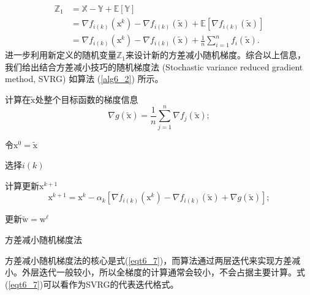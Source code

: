 \begin{equation}
    \begin{aligned}
    \mathbb{Z}_{1} &=\mathbb{X}-\mathbb{Y}+\mathbb{E}[\mathbb{Y}] \\
    &=\nabla f_{i(k)}\left(\mathrm{x}^{k}\right)-\nabla f_{i(k)}(\tilde{\mathrm{x}})+\mathbb{E}\left[\nabla f_{i(k)}(\tilde{\mathrm{x}})\right] \\
    &=\nabla f_{i(k)}\left(\mathrm{x}^{k}\right)-\nabla f_{i(k)}(\tilde{\mathrm{x}})+\frac{1}{n} \sum_{i=1}^{n} f_{i}(\tilde{\mathrm{x}}).
    \end{aligned}
    \nonumber
\end{equation}
进一步利用新定义的随机变量$\mathbb{Z}_{1}$来设计新的方差减小随机梯度。综合以上信息，我们给出结合方差减小技巧的随机梯度法 (Stochastic variance reduced gradient method, SVRG) \cite{SVRG}如算法 (\ref{alg6_2}) 所示。

\begin{algorithm}
    \SetAlgoLined

     {
        计算在$\tilde{\mathrm{x}}$处整个目标函数的梯度信息
            \begin{equation}
                \nabla g(\tilde{\mathrm{x}})=\frac{1}{n} \sum_{j=1}^{n} \nabla f_{j}(\tilde{\mathrm{x}});
                \nonumber
            \end{equation}
            
        令$\mathrm{x}^{0}=\tilde{\mathrm{x}}$
        
         {
            选择$i(k)$
            
            计算更新$\mathrm{x}^{k+1}$ 
                \begin{equation}
                    \mathrm{x}^{k+1}=\mathrm{x}^{k}-\alpha_{k}\left[\nabla f_{i(k)}\left(\mathrm{x}^{k}\right)-\nabla f_{i(k)}(\tilde{\mathrm{x}})+\nabla g(\tilde{\mathrm{x}})\right];
                    \label{eqt6_7}
                \end{equation}
        }
        
        更新$\tilde{\mathrm{w}}=\mathrm{w}^{\ell}$
    }
    \caption{方差减小随机梯度法}
    \label{alg6_2}
\end{algorithm}

\par 方差减小随机梯度法的核心是式(\ref{eqt6_7})，而算法通过两层迭代来实现方差减小。外层迭代一般较小，所以全梯度的计算通常会较小，不会占据主要计算。式(\ref{eqt6_7})可以看作为SVRG的代表迭代格式。

